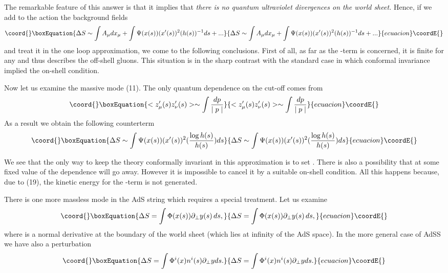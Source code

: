 \documentclass[a4paper,12pt]{article}
\begin{document}
The remarkable feature of this answer is that it implies that \emph{there is
no quantum ultraviolet divergences on the world sheet.} Hence, if we add to
the action the background fields 
\begin{equation}\coord{}\boxEquation{
\Delta S\sim \int A_{\mu }dx_{\mu }+\int \Psi (x(s))(x'(s))^{2}(h(s))^{-1}ds+...
}{
\Delta S\sim \int A_{\mu }dx_{\mu }+\int \Psi (x(s))(x'(s))^{2}(h(s))^{-1}ds+...
}{ecuacion}\coordE{}\end{equation}
and treat it in the one loop approximation, we come to the following
conclusions. First of all, as far as the \coordHE{}-term is concerned, it is finite
for any \coordHE{} and thus describes the off-shell gluons. This
situation is in the sharp contrast with the standard case in which conformal
invariance implied the on-shell condition.

Now let us examine the massive mode (11). The only quantum dependence on the
cut-off comes from 
\begin{equation}\coord{}\boxEquation{
<z'_{\mu }(s)z'_{\nu }(s)>\sim \int \frac{dp}{\mid
p\mid }
}{
<z'_{\mu }(s)z'_{\nu }(s)>\sim \int \frac{dp}{\mid
p\mid }
}{ecuacion}\coordE{}\end{equation}
As a result we obtain the following counterterm 
\begin{equation}\coord{}\boxEquation{
\Delta S\sim \int \Psi (x(s))(x'(s))^{2}(\frac{\log h(s)}{h(s)}
)ds
}{
\Delta S\sim \int \Psi (x(s))(x'(s))^{2}(\frac{\log h(s)}{h(s)}
)ds
}{ecuacion}\coordE{}\end{equation}

We see that the only way to keep the theory conformally invariant in this
approximation is to set \coordHE{}. There is also a possibility that at some
fixed value of \myHighlight{$\lambda $}\coordHE{} the \coordHE{} dependence will go away. However it is
impossible to cancel it by a suitable on-shell condition. All this happens
because, due to (19), the kinetic energy for the \myHighlight{$\Psi $}\coordHE{}-term is not
generated.

There is one more massless mode in the AdS string which requires a special
treatment. Let us examine 
\begin{equation}\coord{}\boxEquation{
\Delta S=\int \Phi (x(s))\partial _{\bot }y(s)\,ds,
}{
\Delta S=\int \Phi (x(s))\partial _{\bot }y(s)\,ds,
}{ecuacion}\coordE{}\end{equation}
where \myHighlight{$\partial _{\bot }$}\coordHE{} is a normal derivative at the boundary of the
world sheet (which lies at infinity of the AdS space). In the more general
case of AdS\coordHE{}S\coordHE{} we have also a perturbation 
\begin{equation}\coord{}\boxEquation{
\Delta S=\int \Phi ^{i}(x)n^{i}(s)\partial _{\bot }yds.
}{
\Delta S=\int \Phi ^{i}(x)n^{i}(s)\partial _{\bot }yds.
}{ecuacion}\coordE{}\end{equation}
\end{document}
